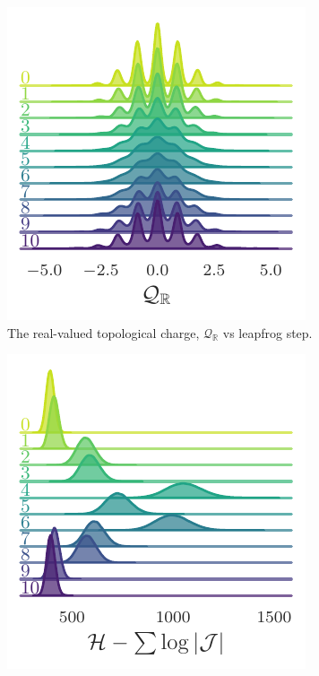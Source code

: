 \documentclass{article} %
\begin{document}
{\begin{figure}[htpb]
\begin{subfigure}{0.31\textwidth}
      \includegraphics[width=\textwidth]{figures/2021-03-09/sinQf_1755.pdf}
      \caption{\label{fig:sinQf}The real-valued topological charge, \(\mathcal{Q}_{\mathbb{R}}\) vs leapfrog step.}%
   \end{subfigure}
   \hfill
   \begin{subfigure}{0.31\textwidth}
      \includegraphics[width=\textwidth]{figures/2021-03-09/hwf_1756.pdf}

\end{subfigure}
\end{figure}}
\end{document}
